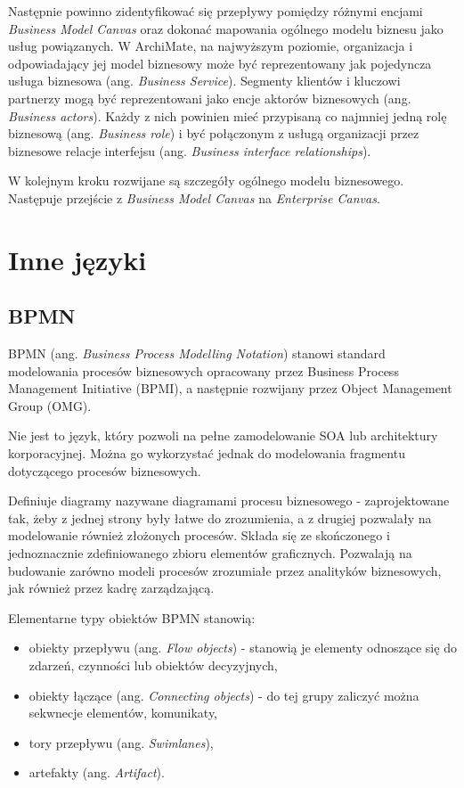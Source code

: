 Następnie powinno zidentyfikować się przepływy pomiędzy różnymi encjami \emph{Business Model Canvas} oraz dokonać mapowania ogólnego modelu biznesu jako usług powiązanych. W ArchiMate, na najwyższym poziomie, organizacja i odpowiadający jej model biznesowy może być reprezentowany jak pojedyncza usługa biznesowa (ang. \emph{Business Service}). Segmenty klientów i kluczowi partnerzy mogą być reprezentowani jako encje aktorów biznesowych (ang. \emph{Business actors}). Każdy z nich powinien mieć przypisaną co najmniej jedną rolę biznesową (ang. \emph{Business role}) i być połączonym z usługą organizacji przez biznesowe relacje interfejsu (ang. \emph{Business interface relationships}).

W kolejnym kroku rozwijane są szczegóły ogólnego modelu biznesowego. Następuje przejście z \emph{Business Model Canvas} na \emph{Enterprise Canvas}. 


\section{Inne języki}

\subsection{BPMN}
BPMN (ang. \textit{Business Process Modelling Notation}) stanowi standard modelowania procesów biznesowych opracowany przez Business Process Management Initiative (BPMI), a następnie rozwijany przez Object Management Group (OMG). 

Nie jest to język, który pozwoli na pełne zamodelowanie SOA lub architektury korporacyjnej. Można go wykorzystać jednak do modelowania fragmentu dotyczącego procesów biznesowych.

Definiuje diagramy nazywane diagramami procesu biznesowego - zaprojektowane tak, żeby z jednej strony były łatwe do zrozumienia, a z drugiej pozwalały na modelowanie również złożonych procesów. Składa się ze skończonego i jednoznacznie zdefiniowanego zbioru elementów graficznych. Pozwalają na budowanie zarówno modeli procesów zrozumiałe przez analityków biznesowych, jak również przez kadrę zarządzającą.

Elementarne typy obiektów BPMN stanowią: 
\begin{itemize}
\item{obiekty przepływu (ang. \emph{Flow objects}) - stanowią je elementy odnoszące się do zdarzeń, czynności lub obiektów decyzyjnych}, 
\item{obiekty łączące (ang. \emph{Connecting objects})} - do tej grupy zaliczyć można sekwnecje elementów, komunikaty, 
\item{tory przepływu (ang. \emph{Swimlanes})},
\item{artefakty (ang. \emph{Artifact})}.
\end{itemize}

